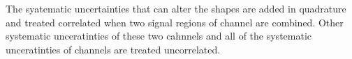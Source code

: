\noindent The syatematic uncertainties that can alter the shapes are added in quadrature and 
treated correlated when two signal regions of \tauTau channel are combined. Other systematic unceratinties of these two 
cahnnels and all of the systematic unceratinties of \leptonTau channels are treated uncorrelated.


